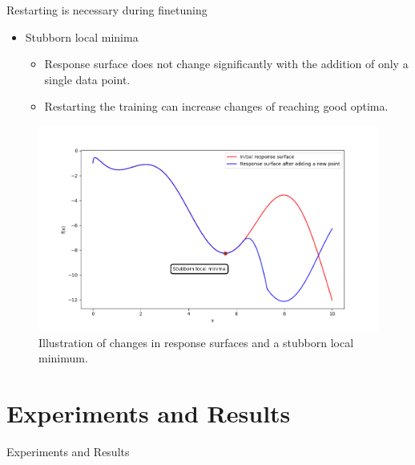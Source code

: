 \documentclass{beamer}
\begin{document}
\begin{frame}[t]{Restarting is necessary during finetuning}
\begin{itemize}
\item Stubborn local minima
\begin{itemize}
\item Response surface does not change significantly with the addition of only a single data point.
\item Restarting the training can increase changes of reaching good optima.
\end{itemize} 
\end{itemize}

\begin{figure}[htb]
  \centering
    \includegraphics[scale=0.37]{images/localMinima}
    \caption{Illustration of changes in response surfaces and a stubborn local minimum.}
    \label{fig:localMinima}
\end{figure}

\end{frame}

\section{Experiments and Results}
\begin{frame}

\centering
\LARGE{Experiments and Results}

\end{frame}
\end{document}
